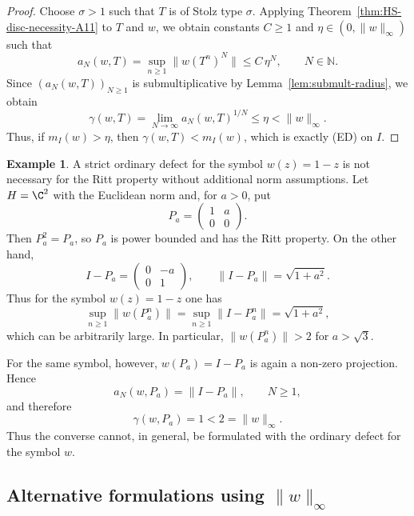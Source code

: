 \documentclass[11pt]{amsart}
\numberwithin{equation}{section}
\theoremstyle{definition}
\newtheorem{example}[theorem]{Example}
\theoremstyle{plain}
\def\N{\mathbb{N}}
\begin{document}
\begin{proof}
Choose $\sigma>1$ such that $T$ is of Stolz type $\sigma$. Applying
Theorem~\ref{thm:HS-disc-necessity-A11} to $T$ and $w$, we obtain constants
$C\ge1$ and $\eta\in(0,\|w\|_\infty)$ such that
\[
   a_N(w,T)=\sup_{n\ge1}\|w(T^n)^N\|\le C\,\eta^N,
   \qquad N\in\N.
\]
Since $(a_N(w,T))_{N\ge1}$ is submultiplicative by
Lemma~\ref{lem:submult-radius}, we obtain
\[
\gamma(w,T)=\lim_{N\to\infty} a_N(w,T)^{1/N}\le \eta<\|w\|_\infty.
\]
Thus, if $m_I(w)>\eta$, then $\gamma(w,T)<m_I(w)$, which is exactly
\textup{(ED)} on $I$.
\end{proof}
\begin{example}\label{ex:projection-exp-not-ordinary}
A strict ordinary defect for the symbol \(w(z)=1-z\) is not necessary
for the Ritt property without
additional norm assumptions.
  Let $H=\C^2$ with the Euclidean norm and, for
$a>0$, put
\[
        P_a=\begin{pmatrix}1&a\\0&0\end{pmatrix}.
\]
Then $P_a^2=P_a$, so $P_a$ is power bounded and has the Ritt property. On the other hand,
\[
        I-P_a=\begin{pmatrix}0&-a\\0&1\end{pmatrix},
        \qquad
        \|I-P_a\|=\sqrt{1+a^2}.
\]
Thus for the symbol \(w(z)=1-z\) one has
\[
        \sup_{n \ge 1}\|w(P_a^n)\|= \sup_{n\ge1}\|I-P_a^n\|=\sqrt{1+a^2},
\]
which can be arbitrarily large.  In particular, $\|w(P_a^n)\|>2$ for $a >\sqrt 3.$

For the same symbol, however,
\(w(P_a)=I-P_a\) is again a non-zero projection. Hence
\[
        a_N(w,P_a)=\|I-P_a\|,\qquad N\ge1,
\]
and therefore
\[
        \gamma(w,P_a)=1<2=\|w\|_\infty .
\]
Thus the converse cannot, in general, be formulated with the ordinary defect
for the symbol \(w\).
\end{example}





\subsection{Alternative formulations using $\|w\|_\infty$}
\end{document}
